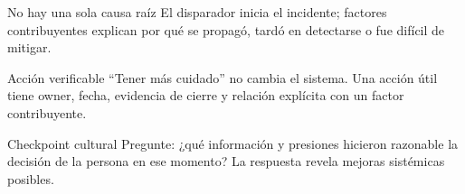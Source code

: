 \documentclass[institutional,screen,none]{ua-engineering-v6-beamer}
\begin{document}
\begin{frame}{No hay una sola causa raíz}
El disparador inicia el incidente; factores contribuyentes explican por qué se propagó, tardó en detectarse o fue difícil de mitigar.
\end{frame}
\begin{frame}{Acción verificable}
``Tener más cuidado'' no cambia el sistema. Una acción útil tiene owner, fecha, evidencia de cierre y relación explícita con un factor contribuyente.
\end{frame}
\begin{frame}{Checkpoint cultural}
Pregunte: ¿qué información y presiones hicieron razonable la decisión de la persona en ese momento? La respuesta revela mejoras sistémicas posibles.
\end{frame}
\end{document}
